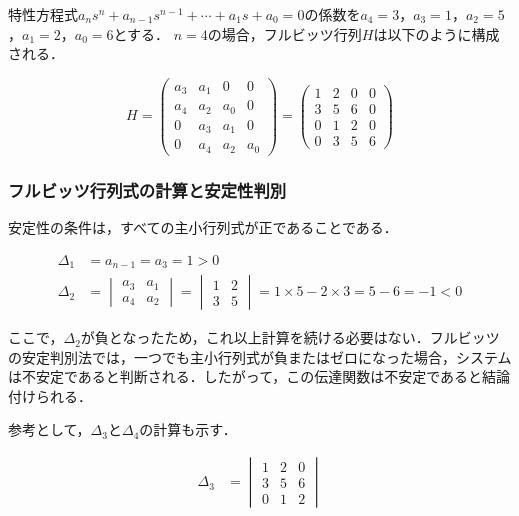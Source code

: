 \documentclass[11pt,a4paper]{ltjsarticle}
\begin{document}
特性方程式$a_n s^n + a_{n-1} s^{n-1} + \cdots + a_1 s + a_0 = 0$の係数を$a_4=3$，$a_3=1$，$a_2=5$，$a_1=2$，$a_0=6$とする．
$n=4$の場合，フルビッツ行列$H$は以下のように構成される．

\begin{equation}
H = \begin{pmatrix}
a_3 & a_1 & 0 & 0 \\
a_4 & a_2 & a_0 & 0 \\
0 & a_3 & a_1 & 0 \\
0 & a_4 & a_2 & a_0
\end{pmatrix} = \begin{pmatrix}
1 & 2 & 0 & 0 \\
3 & 5 & 6 & 0 \\
0 & 1 & 2 & 0 \\
0 & 3 & 5 & 6
\end{pmatrix}
\end{equation}

\subsubsection{フルビッツ行列式の計算と安定性判別}

安定性の条件は，すべての主小行列式が正であることである．

\begin{align}
\Delta_1 &= a_{n-1} = a_3 = 1 > 0 \\
\Delta_2 &= \begin{vmatrix}
a_3 & a_1 \\
a_4 & a_2
\end{vmatrix} = \begin{vmatrix}
1 & 2 \\
3 & 5
\end{vmatrix} = 1 \times 5 - 2 \times 3 = 5 - 6 = -1 < 0
\end{align}

ここで，$\Delta_2$が負となったため，これ以上計算を続ける必要はない．フルビッツの安定判別法では，一つでも主小行列式が負またはゼロになった場合，システムは不安定であると判断される．したがって，この伝達関数は不安定であると結論付けられる．

参考として，$\Delta_3$と$\Delta_4$の計算も示す．

\begin{align}
\Delta_3 &= \begin{vmatrix}
1 & 2 & 0 \\
3 & 5 & 6 \\
0 & 1 & 2
\end{vmatrix}
\end{align}
\end{document}
